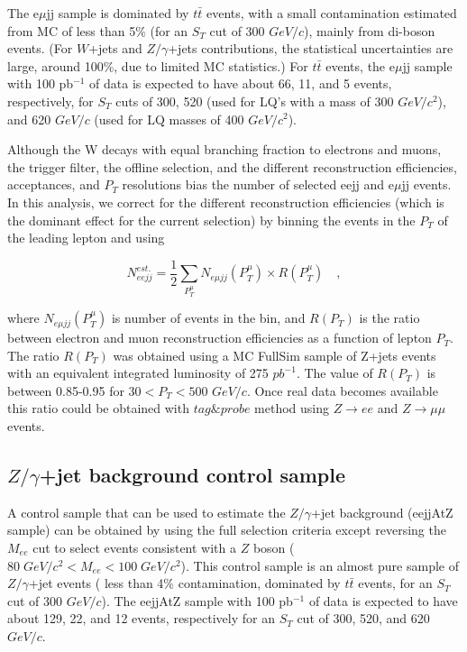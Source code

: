 \documentclass{cmspaper}
\begin{document}
\begin{linenumbers}
The e$\mu$jj sample is dominated by $t\bar{t}$ events, 
with a small contamination estimated from MC of less than 5\% (for an 
$S_{T}$ cut of 300 $GeV/c$), 
mainly from di-boson events. (For $W$+jets and $Z/\gamma$+jets 
contributions, the statistical 
uncertainties are large, around 100\%, due to limited MC statistics.) 
For $t\bar{t}$ events, the e$\mu$jj sample with 100 pb$^{-1}$ of data 
is expected to have about 66, 11, and 5 events, respectively, 
for $S_{T}$ cuts of 300, 520 (used for LQ's with a mass of
300 $GeV/c^2$), and 620 $GeV/c$ (used for LQ masses of 400 $GeV/c^2$).

Although the W decays with equal branching fraction to electrons and muons,
the trigger filter, the offline selection, and the 
different reconstruction efficiencies,
acceptances, and $P_{T}$ resolutions  bias the number of selected eejj 
and e$\mu$jj events. 
In this analysis, we correct for the different reconstruction efficiencies
(which is the dominant effect for the current selection) by
binning the events in the $P_T$ of the leading lepton and using

\begin{equation} \label{formula:NeejFromNemujj}
N_{eejj}^{est.} = \frac{1}{2}\sum_{P_{T}^{\mu}} N_{e\mu jj}(P_{T}^{\mu}) \times R(P_{T}^{\mu}) \quad , 
\end{equation}

where $N_{e\mu jj}(P_{T}^{\mu})$ is number of events in the bin, 
and $R(P_{T})$ is the ratio between electron 
and muon reconstruction efficiencies as a function of lepton $P_{T}$. 
The ratio $R(P_{T})$ was obtained 
using a MC FullSim sample of Z+jets 
events with an equivalent integrated luminosity of 275 $pb^{-1}$.
The value of $R(P_{T})$ is between 0.85-0.95 for $30 < P_{T} < 500$ $GeV/c$.
Once real data becomes available this ratio could be obtained with $tag\&probe$ method using $Z \rightarrow ee$ and 
$Z \rightarrow \mu\mu$ events.

\subsection{$Z/\gamma$+jet background control sample} \label{sec:ZcontrolSample}

A control sample that can be used to
estimate the $Z/\gamma$+jet background (eejjAtZ sample) 
can be obtained by using the full selection criteria except reversing 
the $M_{ee}$ cut to select events consistent with a $Z$ boson
($80\; GeV/c^2 < M_{ee} < 100\; GeV/c^2$). 
This control sample is an almost pure sample of  
$Z/\gamma$+jet events 
( less than 4\% contamination, dominated by $t\bar{t}$ events, 
for an $S_{T}$ cut of 300 $GeV/c$). 
The eejjAtZ sample with 100 pb$^{-1}$ of data 
is expected to have about 129, 22, and 12 events, respectively for an $S_{T}$ cut of 300, 520, and 620 $GeV/c$.


\end{linenumbers}
\end{document}
